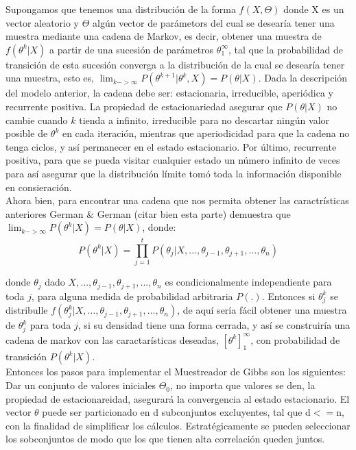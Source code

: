\documentclass[11pt]{book}
\begin{document}
Supongamos que tenemos una distribución de la forma $f(X,\Theta)$ donde X es un vector aleatorio y $\Theta$ algún vector de parámetors del cual se desearía tener una muestra mediante una cadena de Markov, es decir, obtener una muestra de $f(\theta ^{k}|X)$ a partir de una sucesión de parámetros ${\theta}_{1} ^{\infty}$, tal que la probabilidad de transición de esta sucesión converga a la distribución de la cual se desearía tener una muestra, esto es, $\lim_{k->\infty} P(\theta^{k+1}|\theta^{k},X)=P(\theta|X)$. Dada la descripción del modelo anterior, la cadena debe ser: estacionaria, irreducible, aperiódica y recurrente positiva. La propiedad de estacionariedad asegurar que $P(\theta|X)$ no cambie cuando $k$ tienda a infinito, irreducible para no descartar ningún valor posible de $\theta ^{k}$ en cada iteración, mientras que aperiodicidad para que la cadena no tenga ciclos, y así permanecer en el estado estacionario. Por último, recurrente positiva, para que se pueda visitar cualquier estado un número infinito de veces para así asegurar que la distribución límite tomó toda la información disponible en consieración.\\

Ahora bien, para encontrar una cadena que nos permita obtener las caractrísticas anteriores German $\&$ German (citar bien esta parte) demuestra que  $ \lim_{k->\infty} P(\theta^{k}|X)=P(\theta|X)$, donde:
\begin{equation*}
 P(\theta^{k}|X)=\stackrel{~}{{\prod}_{j=1}^{t }}P(\theta_{j}|X,...,\theta_{j-1},\theta_{j+1},...,\theta_{n}) 
\end{equation*}

 donde $\theta_{j}$ dado $X,...,\theta_{j-1},\theta_{j+1},...,\theta_{n}$ es condicionalmente independiente para toda $j$, para alguna medida de probabilidad arbitraria $P(.)$. Entonces si $\theta_{j} ^{k}$ se distribulle $ f(\theta_{j} ^{k}|X,...,\theta_{j-1},\theta_{j+1},...,\theta_{n})$, de aquí sería fácil obtener una muestra de $\theta_{j} ^{k}$ para toda $j$, si su densidad tiene una forma cerrada, y así se construiría una cadena de markov con las caractarísticas deseadas, $[\theta^{k}] _{1} ^{\infty}$, con probabilidad de transición $P(\theta^{k}|X)$.\\

Entonces los pasos para implementar el Muestreador de Gibbs son los siguientes:\\

Dar un conjunto de valores iniciales $\Theta_{0}$, no importa que valores se den, la propiedad de estacionareidad, asegurará la convergencia al estado estacionario. El vector $\theta$ puede ser particionado en d subconjuntos excluyentes, tal que d$<=$n, con la finalidad de simplificar los cálculos. Estratégicamente se pueden seleccionar los sobconjuntos de modo que los que tienen alta correlación queden juntos.\\
\end{document}
